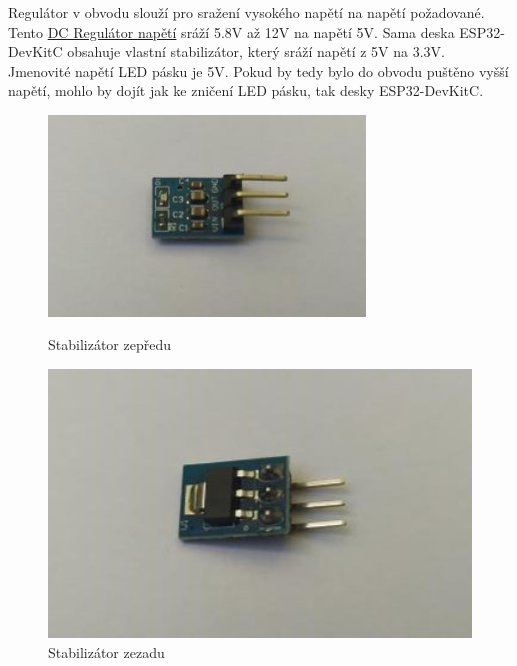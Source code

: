 Regulátor v obvodu slouží pro sražení vysokého napětí na napětí požadované. Tento \href{https://www.amazon.co.uk/DollaTek-AMS1117-5-5V-Voltage-Regulator-4-75V-12V/dp/B07PPKR4HW/ref=sr_1_21?keywords=step+down+7.4v+to+5v&qid=1639337812&sr=8-21}{DC Regulátor napětí} sráží 5.8V až 12V na napětí 5V. Sama deska ESP32-DevKitC obsahuje vlastní stabilizátor, který sráží napětí z 5V na 3.3V. Jmenovité napětí LED pásku je 5V. Pokud by tedy bylo do obvodu puštěno vyšší napětí, mohlo by dojít jak ke zničení LED pásku, tak desky ESP32-DevKitC.



    \begin{figure}[htbp]
	\centering
	\begin{minipage}[b]{0.5\textwidth}
		\centering
		\includegraphics[width=0.75\textwidth]{img/02 ele/Stepdown front.jpg}
		\caption{Stabilizátor zepředu}
	\end{minipage}
	\qquad
	\begin{minipage}[b]{0.4\textwidth}
		\centering
		\includegraphics[width=1\textwidth]{img/02 ele/Stepdown back.jpg}
		\caption{Stabilizátor zezadu}
	\end{minipage}
\end{figure}



